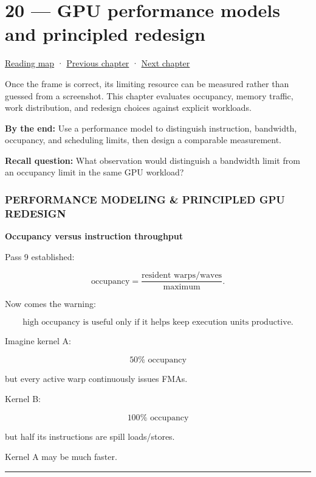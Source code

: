 \hypertarget{05-engine-i-ch020}{}
\chapter{20 --- GPU performance models and principled redesign}\label{05-engine-i-ch020-gpu-performance-models-and-principled-redesign}

\hyperref[volume-reading-map]{Reading map} · \hyperref[05-engine-i-ch019]{Previous chapter} · \hyperref[05-engine-i-ch021]{Next chapter}

Once the frame is correct, its limiting resource can be measured rather than guessed from a screenshot. This chapter evaluates occupancy, memory traffic, work distribution, and redesign choices against explicit workloads.

\textbf{By the end:} Use a performance model to distinguish instruction, bandwidth, occupancy, and scheduling limits, then design a comparable measurement.

\textbf{Recall question:} What observation would distinguish a bandwidth limit from an occupancy limit in the same GPU workload?

\subsection{PERFORMANCE MODELING \& PRINCIPLED GPU REDESIGN}\label{05-engine-i-ch020-performance-modeling-principled-gpu-redesign}

\textbf{Occupancy versus instruction throughput}

Pass 9 established:

\[
\text{occupancy}
=
\frac{
\text{resident warps/waves}
}{
\text{maximum}
}.
\]

Now comes the warning:

\[
\boxed{
\text{high occupancy is useful only if it helps keep execution units productive}.
}
\]

Imagine kernel A:

\[
50\%\text{ occupancy}
\]

but every active warp continuously issues FMAs.

Kernel B:

\[
100\%\text{ occupancy}
\]

but half its instructions are spill loads/stores.

Kernel A may be much faster.

\begin{center}\rule{0.5\linewidth}{0.5pt}\end{center}


